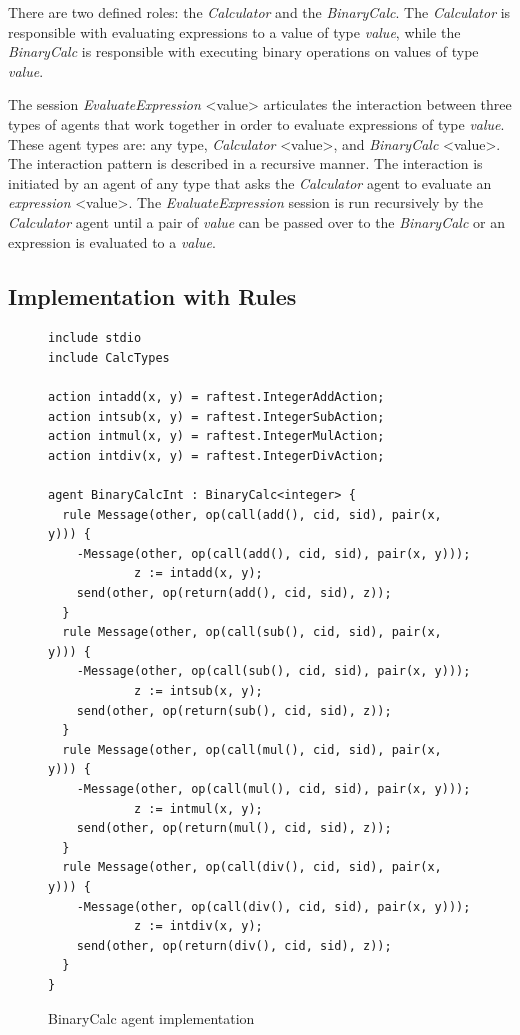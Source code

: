 \documentclass[a4paper,12pt,oneside,fleqn]{book} %
\begin{document}
There are two defined roles: the \textit{Calculator} and the
\textit{BinaryCalc}. The \textit{Calculator} is responsible with evaluating
expressions to a value of type \textit{value}, while the
\textit{BinaryCalc} is responsible with executing binary operations on
values of type \textit{value}.

The session \textit{EvaluateExpression} <value> articulates the interaction
between three types of agents that work together in order to evaluate
expressions of type \textit{value}. These agent types are: any type,
\textit{Calculator} <value>, and \textit{BinaryCalc} <value>. The
interaction pattern is described in a recursive manner. The interaction is
initiated by an agent of any type that asks the \textit{Calculator} agent
to evaluate an \textit{expression} <value>. The \textit{EvaluateExpression}
session is run recursively by the \textit{Calculator} agent until a pair of
\textit{value} can be passed over to the \textit{BinaryCalc} or an
expression is evaluated to a \textit{value}.
\subsection{Implementation with Rules} %
\begin{figure}\footnotesize %
\begin{verbatim}
include stdio
include CalcTypes

action intadd(x, y) = raftest.IntegerAddAction;
action intsub(x, y) = raftest.IntegerSubAction;
action intmul(x, y) = raftest.IntegerMulAction;
action intdiv(x, y) = raftest.IntegerDivAction;

agent BinaryCalcInt : BinaryCalc<integer> {
  rule Message(other, op(call(add(), cid, sid), pair(x, y))) {
    -Message(other, op(call(add(), cid, sid), pair(x, y)));
            z := intadd(x, y);
    send(other, op(return(add(), cid, sid), z));
  }
  rule Message(other, op(call(sub(), cid, sid), pair(x, y))) {
    -Message(other, op(call(sub(), cid, sid), pair(x, y)));
            z := intsub(x, y);
    send(other, op(return(sub(), cid, sid), z));
  }
  rule Message(other, op(call(mul(), cid, sid), pair(x, y))) {
    -Message(other, op(call(mul(), cid, sid), pair(x, y)));
            z := intmul(x, y);
    send(other, op(return(mul(), cid, sid), z));
  }
  rule Message(other, op(call(div(), cid, sid), pair(x, y))) {
    -Message(other, op(call(div(), cid, sid), pair(x, y)));
            z := intdiv(x, y);
    send(other, op(return(div(), cid, sid), z));
  }
}
\end{verbatim}
\caption{BinaryCalc agent implementation}
\label{fig:bcalc-rules}
\end{figure} %
\end{document}

